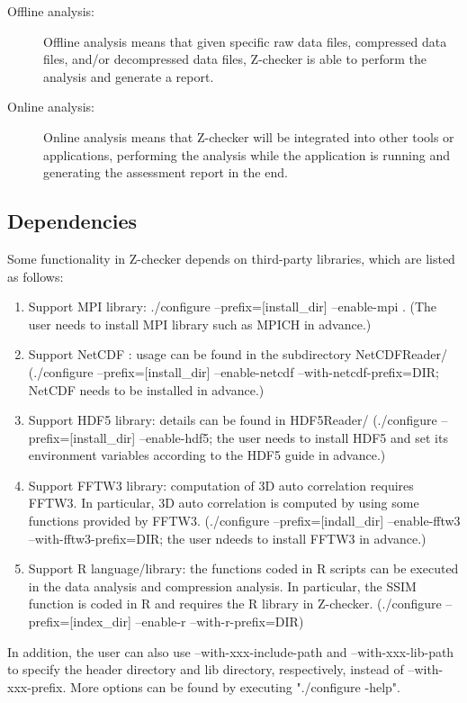 \begin{description}
\item[Offline analysis:] Offline analysis means that given specific raw data files, compressed data files, and/or decompressed data files, Z-checker is able to perform the analysis and generate a report.

\item[Online analysis:] Online analysis means that Z-checker will be integrated into other tools or applications, performing the analysis while the application is running and generating the assessment report in the end.

\end{description}

\subsection{Dependencies}

Some functionality in Z-checker depends on third-party libraries, which are listed as follows:

\begin{enumerate}
\item Support MPI library: ./configure --prefix=[install\_dir] --enable-mpi . (The user needs to install MPI library such as MPICH in advance.)
\item Support NetCDF : usage can be found in the subdirectory NetCDFReader/ (./configure --prefix=[install\_dir] --enable-netcdf --with-netcdf-prefix=DIR; NetCDF needs to be installed in advance.)
\item Support HDF5 library: details can be found in HDF5Reader/ (./configure --prefix=[install\_dir] --enable-hdf5; the user needs to install HDF5 and set its environment variables according to the HDF5 guide in advance.)
\item Support FFTW3 library: computation of 3D auto correlation requires FFTW3. In particular, 3D auto correlation is computed by using some functions provided by FFTW3. (./configure --prefix=[indall\_dir] --enable-fftw3 --with-fftw3-prefix=DIR; the user ndeeds to install FFTW3 in advance.)
\item Support R language/library: the functions coded in R scripts can be executed in the data analysis and compression analysis. In particular, the SSIM function is coded in R and requires the R library in Z-checker. (./configure --prefix=[index\_dir] --enable-r --with-r-prefix=DIR)
\end{enumerate}

In addition, the user can also use --with-xxx-include-path and --with-xxx-lib-path to specify the header directory and lib directory, respectively, instead of --with-xxx-prefix. More options can be found by executing "./configure -help".


